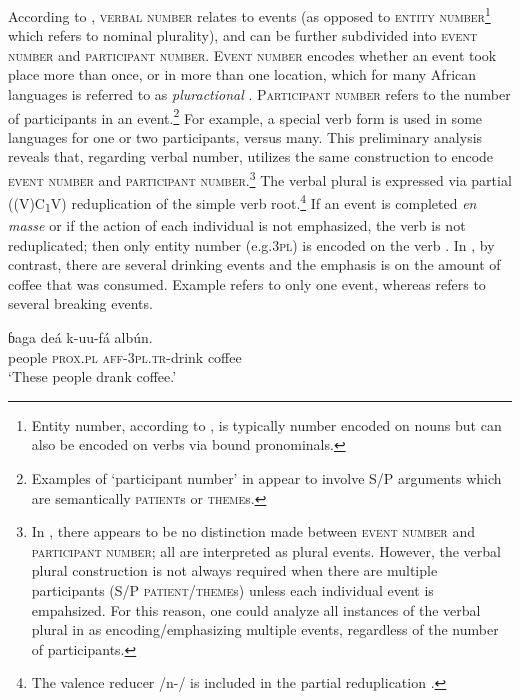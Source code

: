 \documentclass[output=paper]{langsci/langscibook}
\begin{document}
According to \citet[246-249]{Corbett2000}, \textsc{verbal number} relates to events (as opposed to \textsc{entity number}\footnote{Entity number, according to \citet{Corbett2000}, is typically number encoded on nouns but can also be encoded on verbs via bound pronominals.} which refers to nominal plurality), and can be further subdivided into \textsc{event number} and \textsc{participant number}. \textsc{Event number} encodes whether an event took place more than once, or in more than one location, which for many African languages is referred to as \textit{pluractional} \citep[243]{Corbett2000}. \textsc{Participant number} refers to the number of participants in an event.\footnote{Examples of ‘participant number’ in \citet[247-8]{Corbett2000} appear to involve S/P arguments which are semantically \textsc{patient}s or \textsc{theme}s.} For example, a special verb form is used in some languages for one or two participants, versus many. This preliminary analysis reveals that, regarding verbal number,  utilizes the same construction to encode \textsc{event number} and \textsc{participant number}.\footnote{In , there appears to be no distinction made between \textsc{event number }and \textsc{participant number}; all are interpreted as plural events. However, the verbal plural construction is not always required when there are multiple participants (S/P \textsc{patient}/\textsc{theme}s) unless each individual event is empahsized. For this reason, one could analyze all instances of the verbal plural in  as encoding/emphasizing multiple events, regardless of the number of participants.} The verbal plural is expressed via partial ((V)C\textsubscript{1}V) reduplication of the simple verb root.\footnote{The valence reducer /n-/ is included in the partial reduplication .} If an event is completed \textit{en masse} or if the action of each individual is not emphasized, the verb is not reduplicated; then only entity number (e.g.\textsc{3pl}) is encoded on the verb . In , by contrast, there are several drinking events and the emphasis is on the amount of coffee that was consumed. Example  refers to only one event, whereas  refers to several breaking events. 

\ea\label{ex:ahlandc:36}
\gll
ɓaga  deá  k-uu-fá                   alb\'{u}n. \\
people \textsc{prox.pl}  \textsc{aff-3pl.tr}{}-drink   coffee \\
\glt
‘These people drank coffee.’
\z
\end{document}
